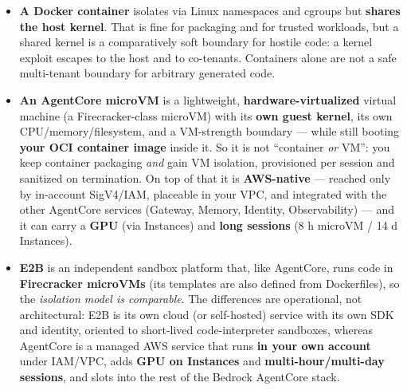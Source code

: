 \documentclass[
  paper=a4,
  ,captions=tableheading
]{scrartcl}
\providecommand{\tightlist}{%
  \setlength{\itemsep}{0pt}\setlength{\parskip}{0pt}}
\begin{document}
\begin{itemize}
\tightlist
\item
  \textbf{A Docker container} isolates via Linux namespaces and cgroups
  but \textbf{shares the host kernel}. That is fine for packaging and
  for trusted workloads, but a shared kernel is a comparatively soft
  boundary for hostile code: a kernel exploit escapes to the host and to
  co-tenants. Containers alone are not a safe multi-tenant boundary for
  arbitrary generated code.
\item
  \textbf{An AgentCore microVM} is a lightweight,
  \textbf{hardware-virtualized} virtual machine (a Firecracker-class
  microVM) with its \textbf{own guest kernel}, its own
  CPU/memory/filesystem, and a VM-strength boundary --- while still
  booting \textbf{your OCI container image} inside it. So it is not
  ``container \emph{or} VM'': you keep container packaging \emph{and}
  gain VM isolation, provisioned per session and sanitized on
  termination. On top of that it is \textbf{AWS-native} --- reached only
  by in-account SigV4/IAM, placeable in your VPC, and integrated with
  the other AgentCore services (Gateway, Memory, Identity,
  Observability) --- and it can carry a \textbf{GPU} (via Instances) and
  \textbf{long sessions} (8 h microVM / 14 d Instances).
\item
  \textbf{E2B} is an independent sandbox platform that, like AgentCore,
  runs code in \textbf{Firecracker microVMs} (its templates are also
  defined from Dockerfiles), so the \emph{isolation model is
  comparable}. The differences are operational, not architectural: E2B
  is its own cloud (or self-hosted) service with its own SDK and
  identity, oriented to short-lived code-interpreter sandboxes, whereas
  AgentCore is a managed AWS service that runs \textbf{in your own
  account} under IAM/VPC, adds \textbf{GPU on Instances} and
  \textbf{multi-hour/multi-day sessions}, and slots into the rest of the
  Bedrock AgentCore stack.
\end{itemize}
\end{document}
